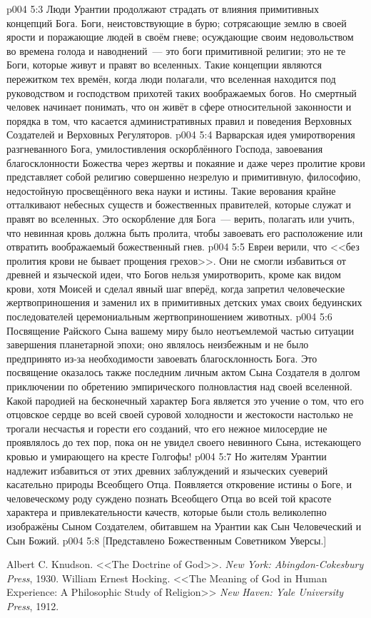 \vs p004 5:3 \pc Люди Урантии продолжают страдать от влияния примитивных концепций Бога. Боги, неистовствующие в бурю; сотрясающие землю в своей ярости и поражающие людей в своём гневе; осуждающие своим недовольством во времена голода и наводнений~--- это боги примитивной религии; это не те Боги, которые живут и правят во вселенных. Такие концепции являются пережитком тех времён, когда люди полагали, что вселенная находится под руководством и господством прихотей таких воображаемых богов. Но смертный человек начинает понимать, что он живёт в сфере относительной законности и порядка в том, что касается административных правил и поведения Верховных Создателей и Верховных Регуляторов.
\vs p004 5:4 \pc Варварская идея умиротворения разгневанного Бога, умилостивления оскорблённого Господа, завоевания благосклонности Божества через жертвы и покаяние и даже через пролитие крови представляет собой религию совершенно незрелую и примитивную, философию, недостойную просвещённого века науки и истины. Такие верования крайне отталкивают небесных существ и божественных правителей, которые служат и правят во вселенных. Это оскорбление для Бога~--- верить, полагать или учить, что невинная кровь должна быть пролита, чтобы завоевать его расположение или отвратить воображаемый божественный гнев.
\vs p004 5:5 Евреи верили, что <<без пролития крови не бывает прощения грехов>>. Они не смогли избавиться от древней и языческой идеи, что Богов нельзя умиротворить, кроме как видом крови, хотя Моисей и сделал явный шаг вперёд, когда запретил человеческие жертвоприношения и заменил их в примитивных детских умах своих бедуинских последователей церемониальным жертвоприношением животных.
\vs p004 5:6 Посвящение Райского Сына вашему миру было неотъемлемой частью ситуации завершения планетарной эпохи; оно являлось неизбежным и не было предпринято из\hyp{}за необходимости завоевать благосклонность Бога. Это посвящение оказалось также последним личным актом Сына Создателя в долгом приключении по обретению эмпирического полновластия над своей вселенной. Какой пародией на бесконечный характер Бога является это учение о том, что его отцовское сердце во всей своей суровой холодности и жестокости настолько не трогали несчастья и горести его созданий, что его нежное милосердие не проявлялось до тех пор, пока он не увидел своего невинного Сына, истекающего кровью и умирающего на кресте Голгофы!
\vs p004 5:7 Но жителям Урантии надлежит избавиться от этих древних заблуждений и языческих суеверий касательно природы Всеобщего Отца. Появляется откровение истины о Боге, и человеческому роду суждено познать Всеобщего Отца во всей той красоте характера и привлекательности качеств, которые были столь великолепно изображёны Сыном Создателем, обитавшем на Урантии как Сын Человеческий и Сын Божий.
\vsetoff
\vs p004 5:8 [Представлено Божественным Советником Уверсы.]
\quizlink
\begin{thebibliography}{100}
Albert C. Knudson.
{<<The Doctrine of God>>.}
{\em New York: Abingdon-Cokesbury Press}, 1930.
William Ernest Hocking.
{<<The Meaning of God in Human Experience: A Philosophic Study of Religion>>}
{\em New Haven: Yale University Press}, 1912.
\end{thebibliography}

